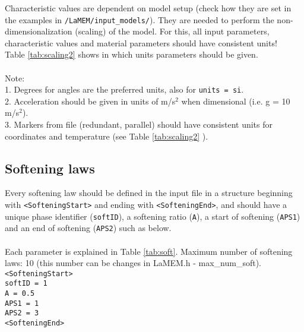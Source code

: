 \documentclass[a4paper,11pt]{article}
\newcommand{\reftab}{Table \ref}
\begin{document}
Characteristic values are dependent on model setup (check how they are set in the examples in \texttt{/LaMEM/input\_models/}). They are needed to perform the non-dimensionalization (scaling) of the model. For this, all input parameters, characteristic values and material parameters should have consistent units!\\

\reftab{tab:scaling2} shows in which units parameters should be given. \\
\\
Note: \\
1. Degrees for angles are the preferred units, also for \texttt{units = si}. \\
2. Acceleration should be given in units of m/s$^2$ when dimensional (i.e. g = 10 m/s$^2$).\\
3. Markers from file (redundant, parallel) should have consistent units for coordinates and temperature (see \reftab{tab:scaling2} ).

\newpage
\subsection{Softening laws}
\label{sec:softlaws}

Every softening law should be defined in the input file in a structure beginning with \texttt{<SofteningStart>} and ending with \texttt{<SofteningEnd>}, and should have a unique phase identifier (\texttt{softID}), a softening ratio (\texttt{A}), a start of softening (\texttt{APS1}) and an end of softening (\texttt{APS2}) such as below. \\
\\
Each parameter is explained in \reftab{tab:soft}. Maximum number of softening laws: 10 (this number can be changes in LaMEM.h - max\_num\_soft).\\

\indent \texttt{<SofteningStart>}\\
\indent \indent \texttt{softID = 1}\\
\indent \indent \texttt{A \hspace{2.7pc}= 0.5}\\
\indent \indent \texttt{APS1 \hspace{0.5pc} = 1}\\
\indent \indent \texttt{APS2 \hspace{0.5pc} = 3}\\
\indent \texttt{<SofteningEnd>}\\
\end{document}

